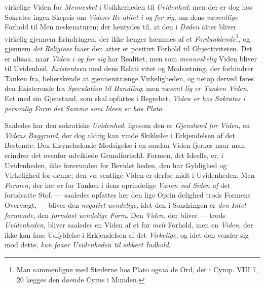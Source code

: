 virkelige Viden for \emph{Mennesket} i Usikkerheden til \emph{Uvidenhed};
men der er dog hos Sokrates ingen Skepsis om \emph{Videns Re\-%
alitet i og for sig}, om dens \emph{væsentlige} Forhold til Men\-%
neskenaturen; der hentydes til, at den i \emph{Døden} atter bliver
virkelig gjennem Erindringen, der ikke længer hæmmes af et
\emph{Fordunklende}\footnote{Man sammenligne med Stederne hos Plato ogsaa
de Ord, der i Cyrop. VIII 7, 20 lægges den døende Cyrus i Munden.}, og
gjennem \emph{det Religiøse} faaer den
atter et positivt Forhold til Objectiviteten. Det er altsaa, naar
\emph{Viden i og for sig} har Realitet, men som \emph{menneskelig}
Viden bliver til Uvidenhed, \emph{Existentsen} med dens Relati\-%
vitet og Modsætning, der forhindrer Tanken fra, beherskende
at gjennemtrænge Virkeligheden, og netop derved føres den
Existerende fra \emph{Speculation til Handling}; men \emph{væsent\-%
lig er Tanken Viden}, Eet med sin Gjenstand, som skal
opfattes i Begrebet. \emph{Viden er hos Sokrates i personlig
Form det Samme som Ideen er hos Plato.}

Saaledes har den sokratiske \emph{Uvidenhed}, ligesom den er
\emph{Gjenstand for Viden}, en \emph{Videns Baggrund}, der dog
aldrig kan vinde Skikkelse i Erkjendelsen af det Bestemte.
Den tilsyneladende Modsigelse i en saadan Viden fjernes naar
man erindrer det ovenfor udviklede Grundforhold. Formen,
det Ideelle, er, i Uvidenheden, ikke forsvunden for Bevidst\-%
heden, den har Gyldighed og Virkelighed for denne; den væ\-%
sentlige Viden er derfor midt i Uvidenheden. Men \emph{Formen},
der her er for Tanken i dens oprindelige \emph{Væren ved Siden af}
det forudsatte Stof, --- saaledes opfattes her den lige Oprin\-%
delighed trods Formens Overvægt, --- bliver den \emph{negativt
uendelige}, idet den i Sondringen er \emph{den Intet formende},
den \emph{formløst uendelige Form}. Den \emph{Viden}, der bliver
--- trods \emph{Uvidenheden}, bliver saaledes en Viden af et for\-%
\emph{melt} Forhold, men en \emph{Viden}, der ikke kan faae Udfyldelse i
Erkjendelsen af det \emph{Virkelige}, og idet den vender sig mod
dette, \emph{kun faaer Uvidenheden til sikkert Indhold}.

